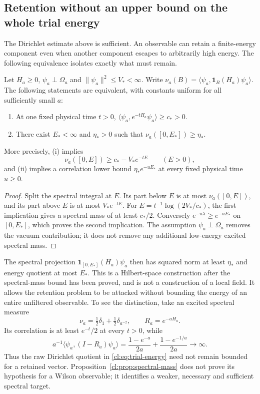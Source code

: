 \subsection{Retention without an upper bound on the whole trial energy}
The Dirichlet estimate above is sufficient. An observable can retain a
finite-energy component even when another component escapes to arbitrarily
high energy. The following equivalence isolates exactly what must remain.

\begin{proposition}\label{cl:prop:spectral-mass}
Let $H_a\ge0$, $\psi_a\perp\Omega_a$ and $\|\psi_a\|^2\le V_*<\infty$.
Write $\nu_a(B)=\langle\psi_a,\mathbf1_B(H_a)\psi_a\rangle$.
The following statements are equivalent, with constants uniform for all
sufficiently small $a$:
\begin{enumerate}[label=\textup{(\roman*)},leftmargin=*]
\item At one fixed physical time $t>0$,
$\langle\psi_a,e^{-tH_a}\psi_a\rangle\ge c_*>0$.
\item There exist $E_*<\infty$ and $\eta_*>0$ such that
$\nu_a([0,E_*])\ge\eta_*$.
\end{enumerate}
More precisely, \textup{(i)} implies
\[
\nu_a([0,E])\ge c_*-V_*e^{-tE}
\qquad(E>0),
\]
and \textup{(ii)} implies a correlation lower bound
$\eta_*e^{-uE_*}$ at every fixed physical time $u\ge0$.
\end{proposition}
\begin{proof}
Split the spectral integral at $E$. Its part below $E$ is at most
$\nu_a([0,E])$, and its part above $E$ is at most $V_*e^{-tE}$.
For $E=t^{-1}\log(2V_*/c_*)$, the first implication gives a spectral
mass of at least $c_*/2$. Conversely $e^{-u\lambda}\ge e^{-uE_*}$ on
$[0,E_*]$, which proves the second implication. The assumption
$\psi_a\perp\Omega_a$ removes the vacuum contribution; it does not
remove any additional low-energy excited spectral mass.
\end{proof}

The spectral projection $\mathbf1_{[0,E_*]}(H_a)\psi_a$ then has squared
norm at least $\eta_*$ and energy quotient at most $E_*$.
This is a Hilbert-space construction after the spectral-mass bound has
been proved, and is not a construction of a local field. It allows the
retention problem to be attacked without bounding the energy of an
entire unfiltered observable. To see the distinction, take an excited
spectral measure
\[
\nu_a=\tfrac12\delta_1+\tfrac12\delta_{a^{-2}},\qquad R_a=e^{-aH_a}.
\]
Its correlation is at least $e^{-t}/2$ at every $t>0$, while
\[
a^{-1}\langle\psi_a,(I-R_a)\psi_a\rangle
=\frac{1-e^{-a}}{2a}+\frac{1-e^{-1/a}}{2a}\longrightarrow\infty.
\]
Thus the raw Dirichlet quotient in \eqref{cl:eq:trial-energy} need not
remain bounded for a retained vector. Proposition~\ref{cl:prop:spectral-mass}
does not prove its hypothesis for a Wilson observable; it identifies a
weaker, necessary and sufficient spectral target.

